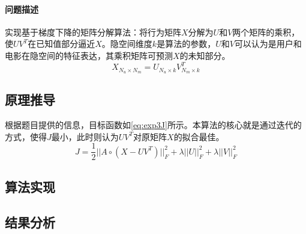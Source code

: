 \documentclass[a4paper,12pt]{article}
\begin{document}
    \paragraph{问题描述}
    实现基于梯度下降的矩阵分解算法：将行为矩阵$X$分解为$U$和$V$两个矩阵的乘积，使$UV^T$在已知值部分逼近$X$。隐空间维度$k$是算法的参数，$U$和$V$可以认为是用户和电影在隐空间的特征表达，其乘积矩阵可预测$X$的未知部分。
    $$
      X_{N_u\times N_m} = U_{N_u\times k}V_{N_m\times k}^T
    $$
    \subsection{原理推导}
    根据题目提供的信息，目标函数如\cref{eq:exp3J}所示。本算法的核心就是通过迭代的方式，使得$J$最小，此时则认为$UV^T$对原矩阵$X$的拟合最佳。
    \begin{equation}
      \label{eq:exp3J}
      J =\frac{1}{2} ||A\circ (X-UV^T)||_F^2 + \lambda ||U||_F^2 + \lambda ||V||_F^2
    \end{equation}
    \subsection{算法实现}

    \subsection{结果分析}

    \label{applastpage}
    \newpage
    
    
\iffalse
\begin{itemize}[noitemsep,topsep=0pt]
\end{itemize}
\begin{enumerate}[label=\Roman{*}.,noitemsep,topsep=0pt]
\end{enumerate}
\begin{multicols}{2}
\end{multicols}
\fi
\end{document}

